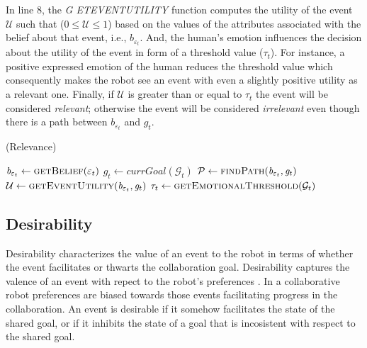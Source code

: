\documentclass[letterpaper]{article}
\begin{document}
In line 8, the \textit{G{\fontsize{8}{8}\selectfont
ET}E{\fontsize{8}{8}\selectfont VENT}U{\fontsize{8}{8}\selectfont TILITY}}
function computes the utility of the event $\mathcal{U}$ such that ($0 \leq
\mathcal{U} \leq 1$) based on the values of the attributes associated with the
belief about that event, i.e., $\mathit{b}_{\varepsilon_t}$. And, the human's
emotion influences the decision about the utility of the event in form of a
threshold value ($\tau_{t}$). For instance, a positive expressed emotion of the
human reduces the threshold value which consequently makes the robot see an
event with even a slightly positive utility as a relevant one. Finally, if
$\mathcal{U}$ is greater than or equal to $\tau_{t}$ the event will be
considered \textit{relevant}; otherwise the event will be considered
\textit{irrelevant} even though there is a path between
$\mathit{b}_{\varepsilon_t}$ and $g_{t}$.

\begin{algorithm}
	\caption{(Relevance)}
	\label{alg:relevance}
	\begin{algorithmic}[1]
			\Statex
			\State $\mathit{b}_{\varepsilon_t} \gets \Call{getBelief}{\varepsilon_t}$
			\State $\mathit{g}_{t} \gets \textit{currGoal}{(\mathcal{G}_{t})}$
			\Statex
			\State $\mathcal{P} \gets \Call{findPath}{\mathit{b}_{\varepsilon_t},
			\mathit{g}_{t}}$
			\Statex
				\State {}
			\Else
				\State $\mathcal{U} \gets \Call{getEventUtility}{\mathit{b}_{\varepsilon_t},
				\mathit{g}_{t}}$ 
				\State $\tau_{t} \gets \Call{getEmotionalThreshold}{\mathcal{G}_{t}}$
				\State {}
				\Else
					\State {}
				\EndIf
			\EndIf
		\EndFunction
	\end{algorithmic}
\end{algorithm}

\subsection{Desirability}

Desirability characterizes the value of an event to the robot in terms of
whether the event facilitates or thwarts the collaboration goal. Desirability
captures the valence of an event with repect to the robot's preferences
\cite{gratch:domain-independent}. In a collaborative robot preferences are
biased towards those events facilitating progress in the collaboration. An event
is desirable if it somehow facilitates the state of the shared goal, or if it
inhibits the state of a goal that is incosistent with respect to the shared
goal.
\end{document}
